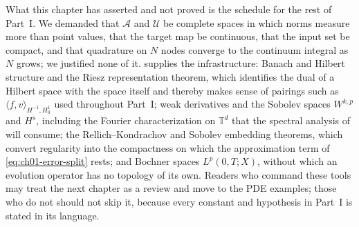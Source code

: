 \bigskip
\noindent What this chapter has asserted and not proved is the schedule for the rest of
Part~I. We demanded that $\mathcal{A}$ and $\mathcal{U}$ be complete spaces in which norms
measure more than point values, that the target map be continuous, that the input set be
compact, and that quadrature on $N$ nodes converge to the continuum integral as $N$ grows; we
justified none of it.  supplies
the infrastructure: Banach and Hilbert structure and the Riesz representation theorem, which
identifies the dual of a Hilbert space with the space itself and thereby makes sense of
pairings such as $\langle f, v \rangle_{H^{-1}, H^{1}_{0}}$ used throughout Part~I; weak
derivatives and the Sobolev spaces $W^{k,p}$ and $H^{s}$, including the Fourier
characterization on $\mathbb{T}^{d}$ that the spectral analysis of
 will consume; the
Rellich--Kondrachov and Sobolev embedding theorems, which convert regularity into the
compactness on which the approximation term of \eqref{eq:ch01-error-split} rests; and Bochner spaces
$L^{p}(0,T;X)$, without which an evolution operator has no topology of its own. Readers who command
these tools may treat the next chapter as a review and move to the PDE examples; those who do
not should not skip it, because every constant and hypothesis in Part~I is stated in its
language.
